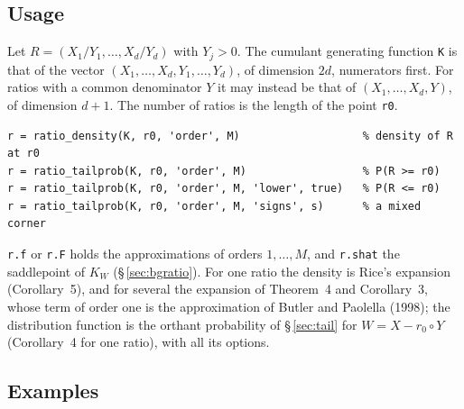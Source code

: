 \documentclass[11pt]{article}
\newcommand{\prog}[1]{\texttt{#1}}
\begin{document}
\subsection{Usage}

Let $R=(X_1/Y_1,\ldots,X_d/Y_d)$ with $Y_j>0$. The cumulant generating function \prog{K} is that of
the vector $(X_1,\ldots,X_d,Y_1,\ldots,Y_d)$, of dimension $2d$, numerators first. For ratios with a
common denominator $Y$ it may instead be that of $(X_1,\ldots,X_d,Y)$, of dimension $d+1$. The
number of ratios is the length of the point \prog{r0}.
\begin{lstlisting}
r = ratio_density(K, r0, 'order', M)                   % density of R at r0
r = ratio_tailprob(K, r0, 'order', M)                  % P(R >= r0)
r = ratio_tailprob(K, r0, 'order', M, 'lower', true)   % P(R <= r0)
r = ratio_tailprob(K, r0, 'order', M, 'signs', s)      % a mixed corner
\end{lstlisting}
\prog{r.f} or \prog{r.F} holds the approximations of orders $1,\ldots,M$, and \prog{r.shat} the
saddlepoint of $K_W$ (\S\,\ref{sec:bgratio}). For one ratio the density is Rice's expansion
(Corollary~5), and for several the expansion of Theorem~4 and Corollary~3, whose term of order one
is the approximation of Butler and Paolella (1998); the distribution function is the orthant
probability of \S\,\ref{sec:tail} for $W=X-r_0\circ Y$ (Corollary~4 for one ratio), with all its
options.

\subsection{Examples}
\end{document}
